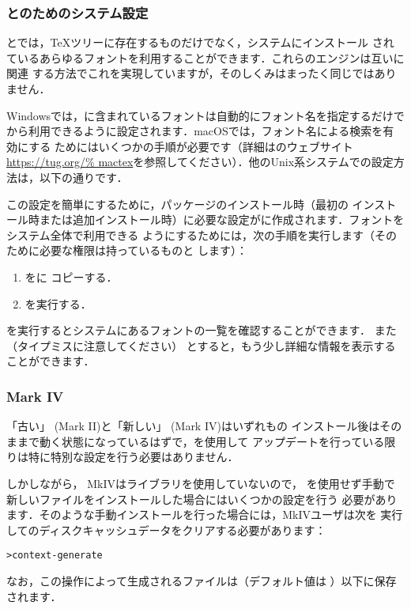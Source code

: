 \documentclass[uplatex,dvipdfmx,tombow]{jsarticle}
\begin{document}
\subsubsection{\XeTeX と\LuaTeX のためのシステム設定}
\label{sec:font-conf-sys}

\XeTeX と\LuaTeX では，\TeX ツリーに存在するものだけでなく，システムにインストール
されているあらゆるフォントを利用することができます．これらのエンジンは互いに関連
する方法でこれを実現していますが，そのしくみはまったく同じではありません．

Windowsでは，\TL に含まれているフォントは自動的にフォント名を指定するだけで\XeTeX
から利用できるように設定されます．macOSでは，フォント名による検索を有効にする
ためにはいくつかの手順が必要です（詳細は\MacTeX のウェブサイト\url{https://tug.org/%
mactex}を参照してください）．他のUnix系システムでの設定方法は，以下の通りです．

この設定を簡単にするために，パッケージのインストール時（最初の\TL
インストール時または追加インストール時）に必要な設定がに作成されます．\TL フォントをシステム全体で利用できる
ようにするためには，次の手順を実行します（そのために必要な権限は持っているものと
します）：
%
\begin{enumerate}[nosep]
\item {}をに
  コピーする．
\item {}を実行する．
\end{enumerate}

を実行するとシステムにあるフォントの一覧を確認することができます．
また（タイプミスに注意してください）
とすると，もう少し詳細な情報を表示することができます．

\subsubsection{{\ConTeXt} Mark IV}
\label{sec:context-mkiv}

「古い」{\ConTeXt} (Mark II)と「新しい」{\ConTeXt} (Mark IV)はいずれも\TL の
インストール後はそのままで動く状態になっているはずで，を使用して
アップデートを行っている限りは特に特別な設定を行う必要はありません．

しかしながら，{\ConTeXt} MkIVは\KPS ライブラリを使用していないので，%
を使用せず手動で新しいファイルをインストールした場合にはいくつかの設定を行う
必要があります．そのような手動インストールを行った場合には，MkIVユーザは次を
実行して\ConTeXt のディスクキャッシュデータをクリアする必要があります：
%
\begin{alltt}
> context -generate
\end{alltt}
%
なお，この操作によって生成されるファイルは（デフォルト値は
）以下に保存されます．
\end{document}
